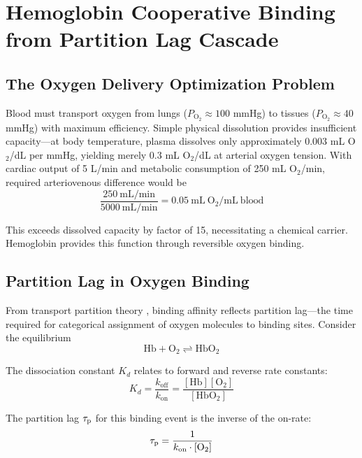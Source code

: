 \section{Hemoglobin Cooperative Binding from Partition Lag Cascade}
\label{sec:hemoglobin}

\subsection{The Oxygen Delivery Optimization Problem}

Blood must transport oxygen from lungs ($P_{\mathrm{O}_{2}} \approx 100$ mmHg) to tissues ($P_{\mathrm{O}_{2}} \approx 40$ mmHg) with maximum efficiency. Simple physical dissolution provides insufficient capacity—at body temperature, plasma dissolves only approximately $0.003$ mL O$_{2}$/dL per mmHg, yielding merely $0.3$ mL O$_{2}$/dL at arterial oxygen tension. With cardiac output of 5 L/min and metabolic consumption of 250 mL O$_{2}$/min, required arteriovenous difference would be
\begin{equation}
\frac{250~\mathrm{mL/min}}{5000~\mathrm{mL/min}} = 0.05~\mathrm{mL~O}_{2}/\mathrm{mL~blood}
\end{equation}

This exceeds dissolved capacity by factor of 15, necessitating a chemical carrier. Hemoglobin provides this function through reversible oxygen binding.

\subsection{Partition Lag in Oxygen Binding}

From transport partition theory \cite{sachikonye2024transport}, binding affinity reflects partition lag—the time required for categorical assignment of oxygen molecules to binding sites. Consider the equilibrium
\begin{equation}
\mathrm{Hb} + \mathrm{O}_{2} \rightleftharpoons \mathrm{HbO}_{2}
\end{equation}

The dissociation constant $K_{d}$ relates to forward and reverse rate constants:
\begin{equation}
K_{d} = \frac{k_{\mathrm{off}}}{k_{\mathrm{on}}} = \frac{[\mathrm{Hb}][\mathrm{O}_{2}]}{[\mathrm{HbO}_{2}]}
\end{equation}

The partition lag $\tau_{\mathrm{p}}$ for this binding event is the inverse of the on-rate:
\begin{equation}
\tau_{\mathrm{p}} = \frac{1}{k_{\mathrm{on}} \cdot [\mathrm{O}_{2}]}
\end{equation}

